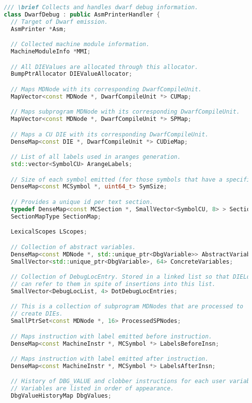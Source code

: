 \documentclass{ctexart}
\begin{document}
\begin{lstlisting}[language=C++]
/// \brief Collects and handles dwarf debug information.
class DwarfDebug : public AsmPrinterHandler {
  // Target of Dwarf emission.
  AsmPrinter *Asm;

  // Collected machine module information.
  MachineModuleInfo *MMI;

  // All DIEValues are allocated through this allocator.
  BumpPtrAllocator DIEValueAllocator;

  // Maps MDNode with its corresponding DwarfCompileUnit.
  MapVector<const MDNode *, DwarfCompileUnit *> CUMap;

  // Maps subprogram MDNode with its corresponding DwarfCompileUnit.
  MapVector<const MDNode *, DwarfCompileUnit *> SPMap;

  // Maps a CU DIE with its corresponding DwarfCompileUnit.
  DenseMap<const DIE *, DwarfCompileUnit *> CUDieMap;

  // List of all labels used in aranges generation.
  std::vector<SymbolCU> ArangeLabels;

  // Size of each symbol emitted (for those symbols that have a specific size).
  DenseMap<const MCSymbol *, uint64_t> SymSize;

  // Provides a unique id per text section.
  typedef DenseMap<const MCSection *, SmallVector<SymbolCU, 8> > SectionMapType;
  SectionMapType SectionMap;

  LexicalScopes LScopes;

  // Collection of abstract variables.
  DenseMap<const MDNode *, std::unique_ptr<DbgVariable>> AbstractVariables;
  SmallVector<std::unique_ptr<DbgVariable>, 64> ConcreteVariables;

  // Collection of DebugLocEntry. Stored in a linked list so that DIELocLists
  // can refer to them in spite of insertions into this list.
  SmallVector<DebugLocList, 4> DotDebugLocEntries;

  // This is a collection of subprogram MDNodes that are processed to
  // create DIEs.
  SmallPtrSet<const MDNode *, 16> ProcessedSPNodes;

  // Maps instruction with label emitted before instruction.
  DenseMap<const MachineInstr *, MCSymbol *> LabelsBeforeInsn;

  // Maps instruction with label emitted after instruction.
  DenseMap<const MachineInstr *, MCSymbol *> LabelsAfterInsn;

  // History of DBG_VALUE and clobber instructions for each user variable.
  // Variables are listed in order of appearance.
  DbgValueHistoryMap DbgValues;


\end{lstlisting}
\end{document}
